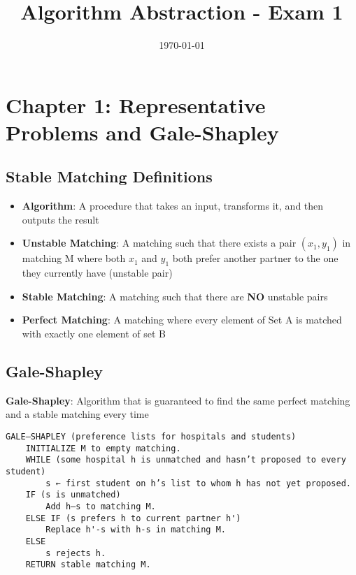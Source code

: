 \documentclass[notitlepage]{article}
\begin{document}
  
\title{Algorithm Abstraction - Exam 1}
\author{}
\date{\isodate\today}

\maketitle

\tableofcontents


\newpage
 

 \section{Chapter 1: Representative Problems and Gale-Shapley}
        \subsection{Stable Matching Definitions}
            \begin{itemize}
                \item \textbf{Algorithm}: A procedure that takes an input, transforms it, and then outputs the result
                \item \textbf{Unstable Matching}: A matching such that there exists a pair $(x_1,y_1)$ in matching M where
                    both $x_1$ and $y_1$ both prefer another partner to the one they currently have (unstable pair)
                \item \textbf{Stable Matching}: A matching such that there are \textbf{NO} unstable pairs 
                \item \textbf{Perfect Matching}: A matching where every element of Set A is matched with exactly
                    one element of set B
            \end{itemize}
        \subsection{Gale-Shapley}
            \textbf{Gale-Shapley}: Algorithm that is guaranteed to find the same perfect matching
            and a stable matching every time
\begin{center}          
     \begin{BVerbatim}
GALE–SHAPLEY (preference lists for hospitals and students)
    INITIALIZE M to empty matching.
    WHILE (some hospital h is unmatched and hasn’t proposed to every student)
        s ← first student on h’s list to whom h has not yet proposed.
    IF (s is unmatched)
        Add h–s to matching M.
    ELSE IF (s prefers h to current partner h')
        Replace h'-s with h-s in matching M.
    ELSE
        s rejects h.
    RETURN stable matching M.
    \end{BVerbatim}
\end{center}      
\end{document}
